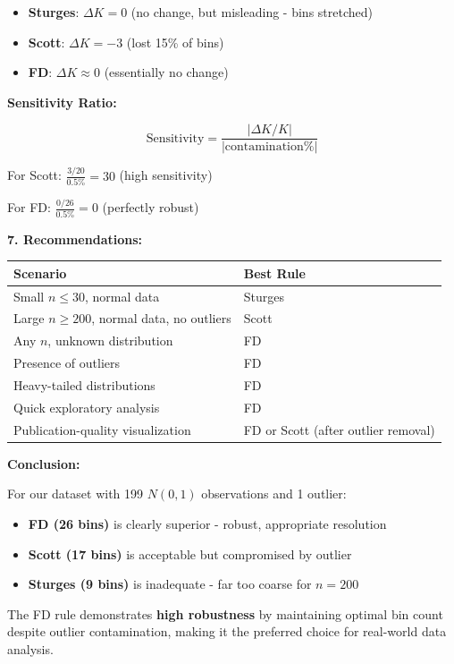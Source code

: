 \documentclass[12pt]{article}
\begin{document}
\begin{explanation}
\begin{itemize}
    \item \textbf{Sturges}: \(\Delta K = 0\) (no change, but misleading - bins stretched)
    \item \textbf{Scott}: \(\Delta K = -3\) (lost 15\% of bins)
    \item \textbf{FD}: \(\Delta K \approx 0\) (essentially no change)
\end{itemize}

\textbf{Sensitivity Ratio:}

\[
\text{Sensitivity} = \frac{|\Delta K / K|}{|\text{contamination}\%|}
\]

For Scott: \(\frac{3/20}{0.5\%} = 30\) (high sensitivity)

For FD: \(\frac{0/26}{0.5\%} = 0\) (perfectly robust)

\textbf{7. Recommendations:}

\begin{center}
\begin{tabular}{|l|l|}
\hline
\textbf{Scenario} & \textbf{Best Rule} \\
\hline
Small \(n \leq 30\), normal data & Sturges \\
Large \(n \geq 200\), normal data, no outliers & Scott \\
Any \(n\), unknown distribution & FD \\
Presence of outliers & FD \\
Heavy-tailed distributions & FD \\
Quick exploratory analysis & FD \\
Publication-quality visualization & FD or Scott (after outlier removal) \\
\hline
\end{tabular}
\end{center}

\textbf{Conclusion:}

For our dataset with 199 \(N(0,1)\) observations and 1 outlier:
\begin{itemize}
    \item \textbf{FD (26 bins)} is clearly superior - robust, appropriate resolution
    \item \textbf{Scott (17 bins)} is acceptable but compromised by outlier
    \item \textbf{Sturges (9 bins)} is inadequate - far too coarse for \(n = 200\)
\end{itemize}

The FD rule demonstrates \textbf{high robustness} by maintaining optimal bin count despite outlier contamination, making it the preferred choice for real-world data analysis.
\end{explanation}
\end{document}
